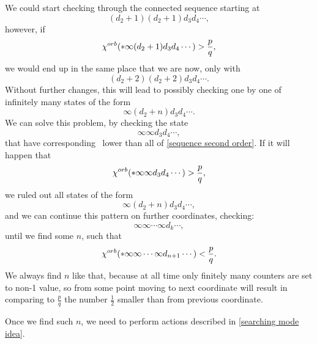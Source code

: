 We could start checking through the connected sequence starting at 
\begin{equation}
(d_2+1)(d_2+1)d_3d_4\cdots, 
\end{equation}
however, if 
\begin{equation}
{\chi^{orb}(*\infty(d_2+1)d_3d_4\cdots)} > \frac{p}{q}, 
\end{equation}
we would end up in the same place that we are now, only with 
\begin{equation}
(d_2+2)(d_2+2)d_3d_4\cdots.
\end{equation}
Without further changes, this will lead to possibly checking one by one of infinitely many states 
of the form 
\begin{equation}\label{sequence second order}
\infty(d_2+n)d_3d_4\cdots. 
\end{equation}
We can solve this problem, by checking the state 
\begin{equation}
\infty\infty d_3d_4\cdots, 
\end{equation}
that have corresponding \Eoc\ lower than all of \ref{sequence second order}. 
If it will happen that 
\begin{equation}
{\chi^{orb}(*\infty\infty d_3d_4\cdots)} > \frac{p}{q},
\end{equation}
we ruled out all states of the form
\begin{equation}
\infty(d_2+n)d_3d_4\cdots,
\end{equation}
and we can continue this pattern on further coordinates, checking: 
\begin{equation}
\infty\infty \cdots \infty d_k\cdots, 
\end{equation}
until we find some $n$, such that
\begin{equation}
{\chi^{orb}(*\infty\infty \cdots \infty d_{n+1}\cdots)} < \frac{p}{q}.
\end{equation}
We always find $n$ like that, because at all time only finitely many counters are set 
to non-1 value, so from some point moving to next coordinate will result in 
comparing to $\frac{p}{q}$ the number $\frac{1}{2}$ smaller than from previous coordinate. 

Once we find such $n$, we need to perform actions described in \ref{searching mode idea}.  



